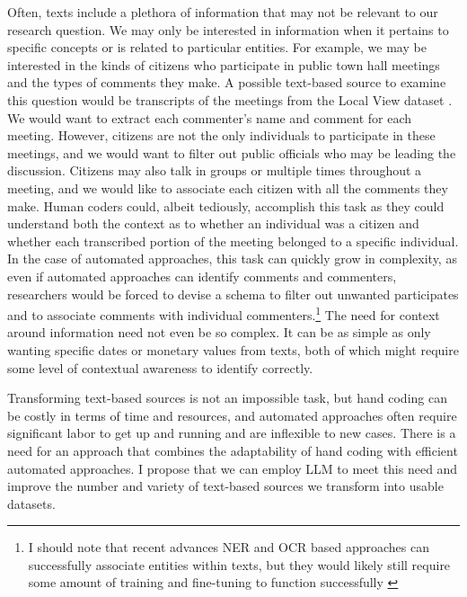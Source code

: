     Often, texts include a plethora of information that may not be relevant to our research question. We may only be interested in information when it pertains to specific concepts or is related to particular entities. For example, we may be interested in the kinds of citizens who participate in public town hall meetings and the types of comments they make. A possible text-based source to examine this question would be transcripts of the meetings from the Local View dataset \citep{barariLocalViewDatabasePublic2023}. We would want to extract each commenter's name and comment for each meeting. However, citizens are not the only individuals to participate in these meetings, and we would want to filter out public officials who may be leading the discussion. Citizens may also talk in groups or multiple times throughout a meeting, and we would like to associate each citizen with all the comments they make. Human coders could, albeit tediously, accomplish this task as they could understand both the context as to whether an individual was a citizen and whether each transcribed portion of the meeting belonged to a specific individual. In the case of automated approaches, this task can quickly grow in complexity, as even if automated approaches can identify comments and commenters, researchers would be forced to devise a schema to filter out unwanted participates and to associate comments with individual commenters.\footnote{I should note that recent advances NER and OCR based approaches can successfully associate entities within texts, but they would likely still require some amount of training and fine-tuning to function successfully \citep{kimOCRfreeDocumentUnderstanding2022}} The need for context around information need not even be so complex. It can be as simple as only wanting specific dates or monetary values from texts, both of which might require some level of contextual awareness to identify correctly.

    Transforming text-based sources is not an impossible task, but hand coding can be costly in terms of time and resources, and automated approaches often require significant labor to get up and running and are inflexible to new cases. There is a need for an approach that combines the adaptability of hand coding with efficient automated approaches. I propose that we can employ LLM to meet this need and improve the number and variety of text-based sources we transform into usable datasets.



